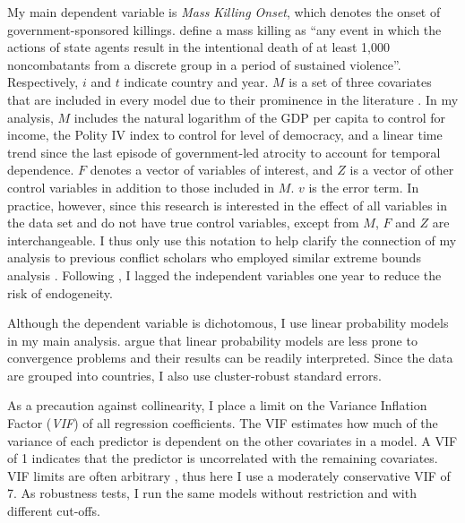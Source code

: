 \documentclass[a4paper,12pt]{article}
\begin{document}
My main dependent variable is \textit{Mass Killing Onset}, which denotes the onset of government-sponsored killings. \citet[2]{ulfelder2008assessing} define a mass killing as ``any event in which the actions of state agents result in the intentional death of at least 1,000 noncombatants from a discrete group in a period of sustained violence''. Respectively, $i$ and $t$ indicate country and year. $M$ is a set of three covariates that are included in every model due to their prominence in the literature \citep{levine1992vale}. In my analysis, $M$ includes the natural logarithm of the GDP per capita to control for income, the Polity IV index to control for level of democracy, and a linear time trend since the last episode of government-led atrocity to account for temporal dependence. $F$ denotes a vector of variables of interest, and $Z$ is a vector of other control variables in addition to those included in $M$. $v$ is the error term. In practice, however, since this research is interested in the effect of all variables in the data set and do not have true control variables, except from $M$, $F$ and $Z$ are interchangeable. I thus only use this notation to help clarify the connection of my analysis to previous conflict scholars who employed similar extreme bounds analysis \citep[e.g.,][]{hegre2006sensitivity,gassebner2016expect}. Following \citet[514]{hegre2006sensitivity}, I lagged the independent variables one year to reduce the risk of endogeneity. 

Although the dependent variable is dichotomous, I use linear probability models in my main analysis. \citet[298]{gassebner2016expect} argue that linear probability models are less prone to convergence problems and their results can be readily interpreted. Since the data are grouped into countries, I also use cluster-robust standard errors.
	 
As a precaution against collinearity, I place a limit on the Variance Inflation Factor (\textit{VIF}) of all regression coefficients. The VIF estimates how much of the variance of each predictor is dependent on the other covariates in a model. A VIF of 1 indicates that the predictor is uncorrelated with the remaining covariates. VIF limits are often arbitrary \citep{bell2015examining,o2007caution}, thus here I use a moderately conservative VIF of 7. As robustness tests, I run the same models without restriction and with different cut-offs.
	
\end{document}
